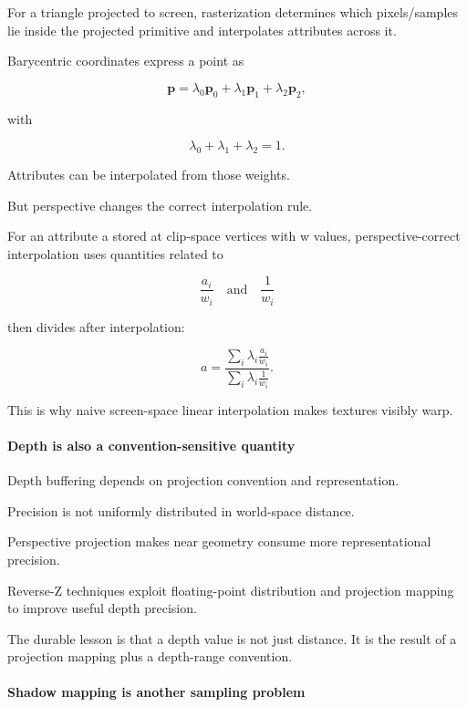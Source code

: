 For a triangle projected to screen, rasterization determines which pixels/samples lie inside the projected primitive and interpolates attributes across it.

Barycentric coordinates express a point as

\[
\mathbf p
=
\lambda_0\mathbf p_0
+
\lambda_1\mathbf p_1
+
\lambda_2\mathbf p_2,
\]

with

\[
\lambda_0+\lambda_1+\lambda_2=1.
\]

Attributes can be interpolated from those weights.

But perspective changes the correct interpolation rule.

For an attribute a stored at clip-space vertices with w values, perspective-correct interpolation uses quantities related to

\[
\frac{a_i}{w_i}
\quad\text{and}\quad
\frac{1}{w_i}
\]

then divides after interpolation:

\[
a
=
\frac{
\sum_i \lambda_i \frac{a_i}{w_i}
}{
\sum_i \lambda_i \frac{1}{w_i}
}.
\]

This is why naive screen-space linear interpolation makes textures visibly warp.

\paragraph{Depth is also a convention-sensitive quantity}\label{03-visual-computing-i-ch001-depth-is-also-a-convention-sensitive-quantity}

\hypertarget{03-visual-computing-i-ch001-depth-is-also-a-convention-sensitive-quantity}{}

Depth buffering depends on projection convention and representation.

Precision is not uniformly distributed in world-space distance.

Perspective projection makes near geometry consume more representational precision.

Reverse-Z techniques exploit floating-point distribution and projection mapping to improve useful depth precision.

The durable lesson is that a depth value is not just distance. It is the result of a projection mapping plus a depth-range convention.

\paragraph{Shadow mapping is another sampling problem}\label{03-visual-computing-i-ch001-shadow-mapping-is-another-sampling-problem}

